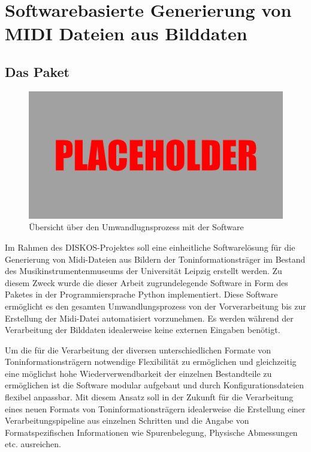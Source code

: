 \FloatBarrier

\section{Softwarebasierte Generierung von MIDI Dateien aus Bilddaten}

\subsection{Das  Paket}

\begin{figure}[t]
    \centering
    \includegraphics[width=\textwidth]{graphics/placeholder.png}
    \caption{Übersicht über den Umwandlugnsprozess mit der  Software}
    \label{softwareworkflow}
\end{figure}

Im Rahmen des DISKOS-Projektes soll eine einheitliche Softwarelösung für die Generierung von Midi-Dateien aus Bildern der Toninformationsträger im Bestand des Musikinstrumentenmuseums der Universität Leipzig erstellt werden.
Zu diesem Zweck wurde die dieser Arbeit zugrundelegende Software in Form des  Paketes in der Programmiersprache Python \parencite[]{van1995python} implementiert.
Diese Software ermöglicht es den gesamten Umwandlungsprozess von der Vorverarbeitung bis zur Erstellung der Midi-Datei automatisiert vorzunehmen.
Es werden während der Verarbeitung der Bilddaten idealerweise keine externen Eingaben benötigt.

Um die für die Verarbeitung der diversen unterschiedlichen Formate von Toninformationsträgern notwendige Flexibilität zu ermöglichen und gleichzeitig eine möglichst hohe Wiederverwendbarkeit der einzelnen Bestandteile zu ermöglichen ist die Software modular aufgebaut und durch Konfigurationsdateien flexibel anpassbar.
Mit diesem Ansatz soll in der Zukunft für die Verarbeitung eines neuen Formats von Toninformationsträgern idealerweise die Erstellung einer Verarbeitungspipeline aus einzelnen Schritten und die Angabe von Formatspezifischen Informationen wie Spurenbelegung, Physische Abmessungen etc. ausreichen.

